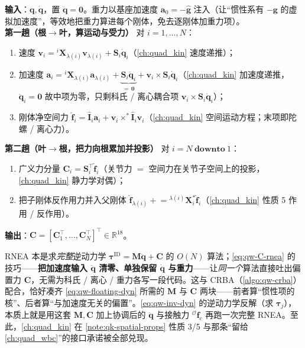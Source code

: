 \begin{algo}\label{algo:qw-rnea}
\textbf{输入}：$\boldsymbol{q},\dot{\boldsymbol{q}}$，置 $\ddot{\boldsymbol{q}}=\mathbf{0}$。重力以基座加速度 $\boldsymbol{a}_0=-\hat{\boldsymbol{g}}$ 注入（让“惯性系有 $-\boldsymbol{g}$ 的虚拟加速度”，等效地把重力算进每个刚体，免去逐刚体加重力项）。\\
\textbf{第一趟（根$\to$叶，算运动与受力）} 对 $i=1,\dots,N$：
\begin{enumerate}
  \item 速度 $\boldsymbol{v}_i={}^{i}\mathbf{X}_{\lambda(i)}\boldsymbol{v}_{\lambda(i)}+\mathbf{S}_i\dot{\boldsymbol{q}}_i$（\cref{ch:quad_kin} 速度递推）；
  \item 加速度 $\boldsymbol{a}_i={}^{i}\mathbf{X}_{\lambda(i)}\boldsymbol{a}_{\lambda(i)}+\underbrace{\mathbf{S}_i\ddot{\boldsymbol{q}}_i}_{=\,\mathbf{0}}+\boldsymbol{v}_i\times\mathbf{S}_i\dot{\boldsymbol{q}}_i$（\cref{ch:quad_kin} 加速度递推，$\ddot{\boldsymbol{q}}_i=\mathbf{0}$ 故中项为零，只剩科氏 / 离心耦合项 $\boldsymbol{v}_i\times\mathbf{S}_i\dot{\boldsymbol{q}}_i$）；
  \item 刚体净空间力 $\hat{\boldsymbol{f}}_i=\hat{\mathbf{I}}_i\boldsymbol{a}_i+\boldsymbol{v}_i\times^{*}\hat{\mathbf{I}}_i\boldsymbol{v}_i$（\cref{ch:quad_kin} 空间运动方程；末项即陀螺 / 离心力）。
\end{enumerate}
\textbf{第二趟（叶$\to$根，把力向根累加并投影）} 对 $i=N\ \textbf{downto}\ 1$：
\begin{enumerate}
  \item 广义力分量 $\boldsymbol{C}_i=\mathbf{S}_i^\top\hat{\boldsymbol{f}}_i$（关节力 $=$ 空间力在关节子空间上的投影，\cref{ch:quad_kin} 静力学对偶）；
  \item 把子刚体反作用力并入父刚体 $\hat{\boldsymbol{f}}_{\lambda(i)}\mathrel{+}={}^{\lambda(i)}\mathbf{X}_i^{*}\hat{\boldsymbol{f}}_i$（\cref{ch:quad_kin} 性质 5 作用 / 反作用）。
\end{enumerate}
\textbf{输出}：$\boldsymbol{C}=[\boldsymbol{C}_1^\top,\dots,\boldsymbol{C}_N^\top]^\top\in\mathbb{R}^{18}$。
\end{algo}

\begin{insight}\label{ins:qw-rnea-trick}
RNEA 本是求\emph{完整}逆动力学 $\boldsymbol{\tau}^{\mathrm{ID}}=\boldsymbol{M}\ddot{\boldsymbol{q}}+\boldsymbol{C}$ 的 $O(N)$ 算法；\cref{eq:qw-C-rnea} 的技巧——\textbf{把加速度输入 $\ddot{\boldsymbol{q}}$ 清零、单独保留 $\dot{\boldsymbol{q}}$ 与重力}——让\emph{同一个}算法直接吐出偏置力 $\boldsymbol{C}$，无需为科氏 / 离心 / 重力各写一段代码。这与 CRBA（\cref{algo:qw-crba}）配合，恰好凑齐 \cref{eq:qw-floating-dyn} 所需的 $\boldsymbol{M}$ 与 $\boldsymbol{C}$ 两块——前者算“惯性项的核”、后者算“与加速度无关的偏置”。\cref{eq:qw-inv-dyn} 的逆动力学反解（求 $\boldsymbol{\tau}_j$），本质上就是用这套 $\boldsymbol{M},\boldsymbol{C}$ 加上协调后的 $\ddot{\boldsymbol{q}}$ 与接触力 ${}^{\mathcal{O}}\boldsymbol{f}_c$ 再跑一次完整 RNEA。至此，\cref{ch:quad_kin} 在 \cref{note:qk-spatial-props} 性质 3/5 与那条“留给 \cref{ch:quad_wbc}”的接口承诺被全部兑现。
\end{insight}


